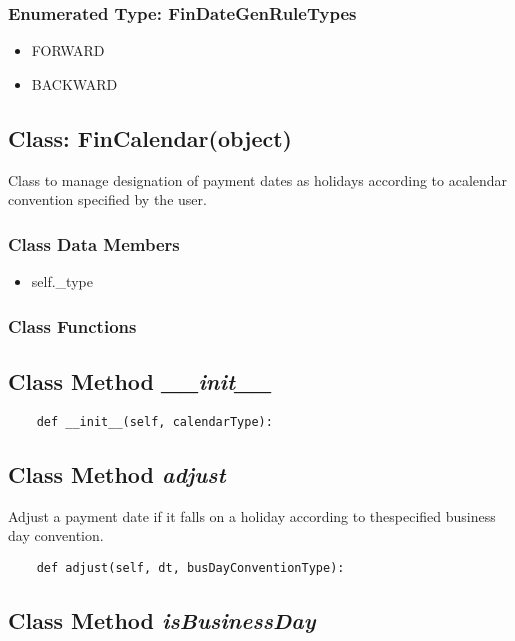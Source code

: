 \documentclass[twoside,11pt]{book}
\begin{document}
\subsubsection{Enumerated Type: FinDateGenRuleTypes}
\begin{itemize}
\item{FORWARD}
\item{BACKWARD}
\end{itemize}

\subsection{Class: FinCalendar(object)}
Class to manage designation of payment dates as holidays according to acalendar convention specified by the user. 

\subsubsection{Class Data Members}
\begin{itemize}
\item{self.\_type}
\end{itemize}

\subsubsection{Class Functions}

\subsection{Class Method {\it \_\_init\_\_}}


\begin{lstlisting}
    def __init__(self, calendarType):
\end{lstlisting}

\subsection{Class Method {\it adjust}}
Adjust a payment date if it falls on a holiday according to thespecified business day convention. 

\begin{lstlisting}
    def adjust(self, dt, busDayConventionType):
\end{lstlisting}

\subsection{Class Method {\it isBusinessDay}}
\end{document}
